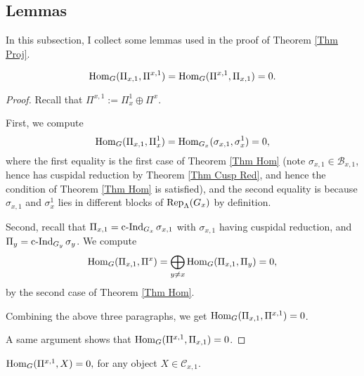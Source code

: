 	\subsection{Lemmas}
	
	In this subsection, I collect some lemmas used in the proof of Theorem \ref{Thm Proj}.
	

	
	\begin{lemma}\label{Lem Ortho}
		$$\operatorname{\operatorname{Hom}}_G(\Pi_{x,1}, \Pi^{x,1})=\operatorname{\operatorname{Hom}}_G(\Pi^{x,1}, \Pi_{x,1})=0.$$
	\end{lemma}
	
	\begin{proof}
		Recall that
		$\Pi^{x,1}:=\Pi_x^1 \oplus \Pi^x$.
		
		First, we compute
		$$\operatorname{\operatorname{Hom}}_G(\Pi_{x,1}, \Pi_x^1)=\operatorname{\operatorname{Hom}}_{G_x}(\sigma_{x,1}, \sigma_x^1)=0,$$
		where the first equality is the first case of Theorem \ref{Thm Hom} (note $\sigma_{x,1} \in \mathcal{B}_{x,1}$, hence has cuspidal reduction by Theorem \ref{Thm Cusp Red}, and hence the condition of Theorem \ref{Thm Hom} is satisfied), and the second equality is because $\sigma_{x,1}$ and $\sigma_x^1$ lies in different blocks of $\operatorname{\operatorname{Rep}}_{\Lambda}(G_x)$ by definition.
		
		Second, recall that $\Pi_{x,1}=\operatorname{\operatorname{c-Ind}}_{G_x}\sigma_{x,1}$ with $\sigma_{x,1}$ having cuspidal reduction, and $\Pi_y=\operatorname{\operatorname{c-Ind}}_{G_y}\sigma_y$. We compute 
		$$\operatorname{\operatorname{Hom}}_G(\Pi_{x,1}, \Pi^x)=\bigoplus_{y \neq x}\operatorname{\operatorname{Hom}}_G(\Pi_{x,1}, \Pi_y)=0,$$
		by the second case of Theorem \ref{Thm Hom}.
		
		Combining the above three paragraphs, we get $\operatorname{\operatorname{Hom}}_G(\Pi_{x,1}, \Pi^{x,1})=0$.
		
		A same argument shows that $\operatorname{\operatorname{Hom}}_G(\Pi^{x,1}, \Pi_{x,1})=0$.
	\end{proof}
	
	\begin{lemma}\label{Lem Gen}
		$\operatorname{\operatorname{Hom}}_G(\Pi^{x,1}, X)=0,$
		for any object $X \in \mathcal{C}_{x,1}$.
	\end{lemma}
	

